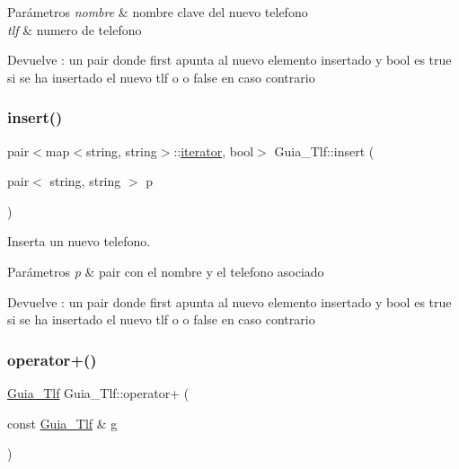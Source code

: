 \begin{DoxyParams}{Parámetros}
{\em nombre} & nombre clave del nuevo telefono \\
\hline
{\em tlf} & numero de telefono \\
\hline
\end{DoxyParams}
\begin{DoxyReturn}{Devuelve}
\+: un pair donde first apunta al nuevo elemento insertado y bool es true si se ha insertado el nuevo tlf o o false en caso contrario 
\end{DoxyReturn}
\mbox{\label{classGuia__Tlf_a773d474972ea06ed8cf1bd031536bf82}} 
\subsubsection{\texorpdfstring{insert()}{insert()}\hspace{0.1cm}{\footnotesize\ttfamily [2/2]}}
{\footnotesize\ttfamily pair$<$map$<$string, string$>$\+::\hyperlink{classGuia__Tlf_1_1iterator}{iterator}, bool$>$ Guia\+\_\+\+Tlf\+::insert (\begin{DoxyParamCaption}\item[{pair$<$ string, string $>$}]{p }\end{DoxyParamCaption})}



Inserta un nuevo telefono. 


\begin{DoxyParams}{Parámetros}
{\em p} & pair con el nombre y el telefono asociado \\
\hline
\end{DoxyParams}
\begin{DoxyReturn}{Devuelve}
\+: un pair donde first apunta al nuevo elemento insertado y bool es true si se ha insertado el nuevo tlf o o false en caso contrario 
\end{DoxyReturn}
\mbox{\label{classGuia__Tlf_a3e0b08a1985d3c72853690730319172f}} 
\subsubsection{\texorpdfstring{operator+()}{operator+()}}
{\footnotesize\ttfamily \hyperlink{classGuia__Tlf}{Guia\+\_\+\+Tlf} Guia\+\_\+\+Tlf\+::operator+ (\begin{DoxyParamCaption}\item[{const \hyperlink{classGuia__Tlf}{Guia\+\_\+\+Tlf} \&}]{g }\end{DoxyParamCaption})}



